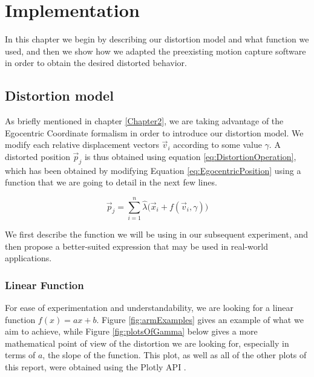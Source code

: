 
\chapter{Implementation} %

\label{Chapter3} %

In this chapter we begin by describing our distortion model and what function we used, and then we show how we adapted the preexisting motion capture software in order to obtain the desired distorted behavior.

\section{Distortion model}


As briefly mentioned in chapter \ref{Chapter2}, we are taking advantage of the Egocentric Coordinate formalism in order to introduce our distortion model. We modify each relative displacement vectors $\vec{v}_i$ according to some value $\gamma$. A distorted position $\vec{p}_j$ is thus obtained using equation \ref{eq:DistortionOperation}, which has been obtained by modifying Equation \ref{eq:EgocentricPosition} using a function that we are going to detail in the next few lines.

\begin{equation}
\label{eq:DistortionOperation}
\vec{p}_j = \displaystyle\sum_{i=1}^{n} \hat{\lambda}\big(\vec{x}_i + f(\vec{v}_i,\gamma )\big)
\end{equation}

We first describe the function we will be using in our subsequent experiment, and then propose a better-suited expression that may be used in real-world applications.

\subsection*{Linear Function}

For ease of experimentation and understandability, we are looking for a linear function $f(x) = ax + b$. Figure \ref{fig:armExamples} gives an example of what we aim to achieve, while Figure \ref{fig:plotsOfGamma} below gives a more mathematical point of view of the distortion we are looking for, especially in terms of $a$, the slope of the function. This plot, as well as all of the other plots of this report, were obtained using the Plotly API \cite{plotly}.

